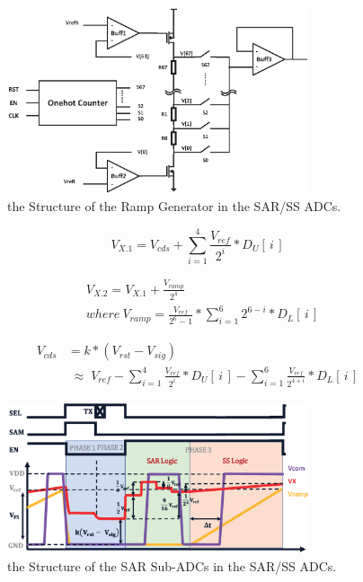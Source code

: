 \documentclass[conference]{IEEEtran}
\begin{document}
\begin{figure}[htbp] 
	\centerline{\includegraphics[width=3.5in]{./Figures/RRAMP.eps}}
	\caption{the Structure of the Ramp Generator in the SAR/SS ADCs.}
	\label{RRAMP}
\end{figure} 

\begin{equation}
	V_{X.1}=V_{cds}+\sum_{i=1}^{4} {\frac{V_{ref}}{2^{i}}\ast{D_{U}\left[\,i\,\right]}}
	\label{eq4}
\end{equation}

\begin{equation}
	\begin{aligned}
	&V_{X.2}=V_{X.1}+\frac{V_{ramp}}{2^4}\\ &where\  V_{ramp}=\frac{V_{ref}}{2^6-1}\ast\sum_{i=1}^{6}2^{6-i}\ast{D_{L}\left[\,i\,\right]}
	\label{eq5}
	\end{aligned}	
\end{equation}

\begin{equation}
	\begin{aligned}
	V_{cds}&=k\ast(V_{rst}-V_{sig})\\
	&\;{\approx}\;{V_{ref}-\sum_{i=1}^{4} \frac{V_{ref}}{2^{i}}\ast{D_{U}\left[\,i\,\right]}-\sum_{i=1}^{6} \frac{V_{ref}}{2^{4+i}}\ast{D_{L}\left[\,i\,\right]}}
	\label{eq6}
	\end{aligned}
\end{equation}

\begin{figure}[htbp]
	\centerline{\includegraphics[width=3.5in]{./Figures/SARWAVE.eps}}
	\caption{the Structure of the SAR Sub-ADCs in the SAR/SS ADCs.}
	\label{SARWAVE}
\end{figure} 
\end{document}
